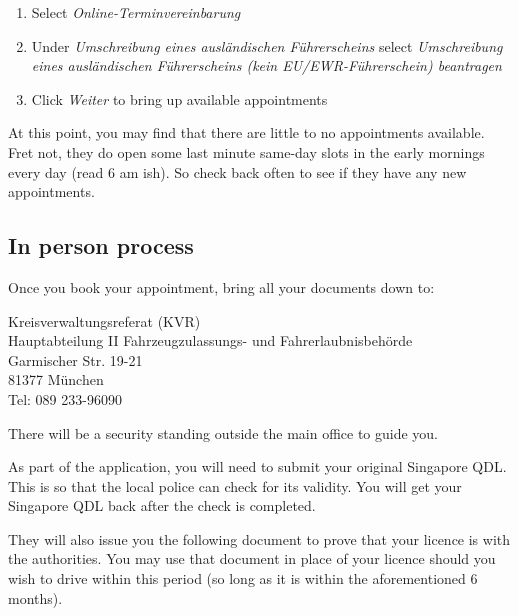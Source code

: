 \documentclass{article}
\newcommand{\de}[1]{\textcolor{NavyBlue}{\textit{#1}}}
\begin{document}
        \begin{enumerate}
            \item Select \de{Online-Terminvereinbarung}
            \item Under \de{Umschreibung eines ausländischen Führerscheins} select \de{Umschreibung eines ausländischen Führerscheins (kein EU/EWR-Führerschein) beantragen}
            \item Click \de{Weiter} to bring up available appointments
        \end{enumerate}
        
        At this point, you may find that there are little to no appointments available. Fret not, they do open some last minute same-day slots in the early mornings every day (read 6 am ish). So check back often to see if they have any new appointments. 
        
    \subsection{In person process}
        Once you book your appointment, bring all your documents down to:
        
        \begin{center}
            Kreisverwaltungsreferat (KVR) \\
            Hauptabteilung II Fahrzeugzulassungs- und Fahrerlaubnisbehörde \\
            Garmischer Str. 19-21 \\
            81377 München \\
            
            Tel: 089 233-96090
        \end{center}
        
        There will be a security standing outside the main office to guide you. 
        
        As part of the application, you will need to submit your original Singapore QDL. This is so that the local police can check for its validity. You will get your Singapore QDL back after the check is completed.
        
        They will also issue you the following document to prove that your licence is with the authorities. You may use that document in place of your licence should you wish to drive within this period (so long as it is within the aforementioned 6 months).
        
\end{document}
